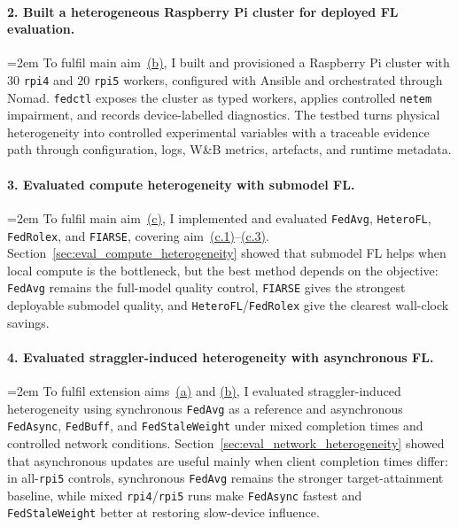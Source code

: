 \paragraph{2. Built a heterogeneous Raspberry Pi cluster for deployed FL evaluation.} \hangindent=2em
To fulfil main aim~\hyperref[aim:b]{(b)}, I built and provisioned a Raspberry Pi cluster with \(30\) \texttt{rpi4} and \(20\) \texttt{rpi5} workers, configured with Ansible and orchestrated through Nomad. \texttt{fedctl} exposes the cluster as typed workers, applies controlled \texttt{netem} impairment, and records device-labelled diagnostics. The testbed turns physical heterogeneity into controlled experimental variables with a traceable evidence path through configuration, logs, W\&B metrics, artefacts, and runtime metadata.

\paragraph{3. Evaluated compute heterogeneity with submodel FL.} \hangindent=2em
To fulfil main aim~\hyperref[aim:c]{(c)}, I implemented and evaluated \texttt{FedAvg}, \texttt{HeteroFL}, \texttt{FedRolex}, and \texttt{FIARSE}, covering aim~\hyperref[aim:c.1]{(c.1)}--\hyperref[aim:c.3]{(c.3)}. Section~\ref{sec:eval_compute_heterogeneity} showed that submodel FL helps when local compute is the bottleneck, but the best method depends on the objective: \texttt{FedAvg} remains the full-model quality control, \texttt{FIARSE} gives the strongest deployable submodel quality, and \texttt{HeteroFL}/\texttt{FedRolex} give the clearest wall-clock savings.

\paragraph{4. Evaluated straggler-induced heterogeneity with asynchronous FL.} \hangindent=2em
To fulfil extension aims~\hyperref[eaim:a]{(a)} and \hyperref[eaim:b]{(b)}, I evaluated straggler-induced heterogeneity using synchronous \texttt{FedAvg} as a reference and asynchronous \texttt{FedAsync}, \texttt{FedBuff}, and \texttt{FedStaleWeight} under mixed completion times and controlled network conditions. Section~\ref{sec:eval_network_heterogeneity} showed that asynchronous updates are useful mainly when client completion times differ: in all-\texttt{rpi5} controls, synchronous \texttt{FedAvg} remains the stronger target-attainment baseline, while mixed \texttt{rpi4}/\texttt{rpi5} runs make \texttt{FedAsync} fastest and \texttt{FedStaleWeight} better at restoring slow-device influence.

